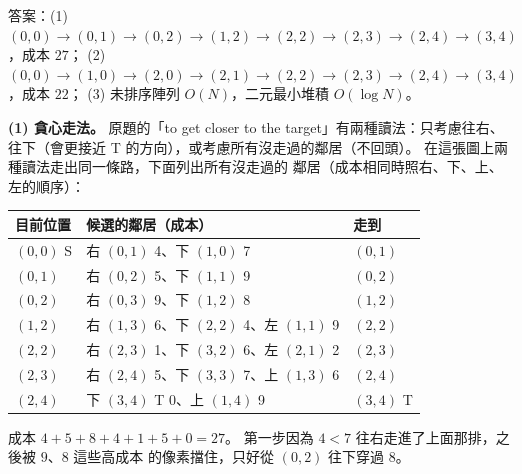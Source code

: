 \begin{pastsoln}
答案：(1) $(0,0) \to (0,1) \to (0,2) \to (1,2) \to (2,2) \to (2,3) \to (2,4) \to (3,4)$，成本 $27$；
(2) $(0,0) \to (1,0) \to (2,0) \to (2,1) \to (2,2) \to (2,3) \to (2,4) \to (3,4)$，成本 $22$；
(3) 未排序陣列 $O(N)$，二元最小堆積 $O(\log N)$。

\textbf{(1) 貪心走法。} 原題的「to get closer to the target」有兩種讀法：只考慮往右、往下（會更接近 T
的方向），或考慮所有沒走過的鄰居（不回頭）。 在這張圖上兩種讀法走出同一條路，下面列出所有沒走過的
鄰居（成本相同時照右、下、上、左的順序）：
\begin{center}
\small
\begin{tabular}{lll}
\toprule
目前位置 & 候選的鄰居（成本） & 走到 \\
\midrule
$(0,0)$ S & 右 $(0,1)$ 4、下 $(1,0)$ 7 & $(0,1)$ \\
$(0,1)$ & 右 $(0,2)$ 5、下 $(1,1)$ 9 & $(0,2)$ \\
$(0,2)$ & 右 $(0,3)$ 9、下 $(1,2)$ 8 & $(1,2)$ \\
$(1,2)$ & 右 $(1,3)$ 6、下 $(2,2)$ 4、左 $(1,1)$ 9 & $(2,2)$ \\
$(2,2)$ & 右 $(2,3)$ 1、下 $(3,2)$ 6、左 $(2,1)$ 2 & $(2,3)$ \\
$(2,3)$ & 右 $(2,4)$ 5、下 $(3,3)$ 7、上 $(1,3)$ 6 & $(2,4)$ \\
$(2,4)$ & 下 $(3,4)$ T 0、上 $(1,4)$ 9 & $(3,4)$ T \\
\bottomrule
\end{tabular}
\end{center}
成本 $4 + 5 + 8 + 4 + 1 + 5 + 0 = 27$。 第一步因為 $4 < 7$ 往右走進了上面那排，之後被 $9$、$8$ 這些高成本
的像素擋住，只好從 $(0,2)$ 往下穿過 $8$。


\end{pastsoln}
